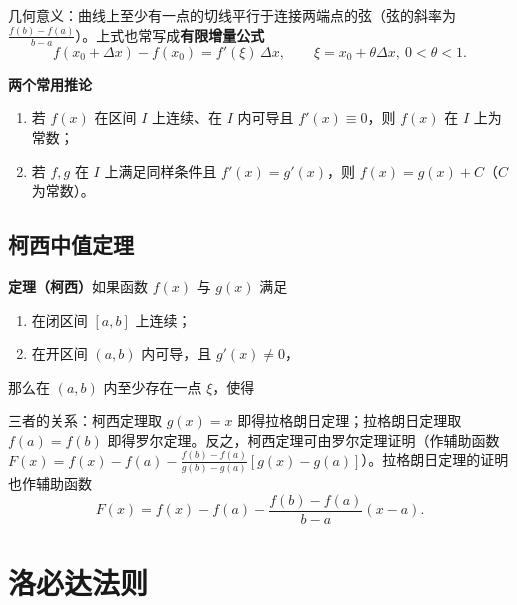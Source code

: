 \noindent 几何意义：曲线上至少有一点的切线平行于连接两端点的弦（弦的斜率为 $\frac{f(b)-f(a)}{b-a}$）。上式也常写成\textbf{有限增量公式}
\[
f(x_0+\Delta x)-f(x_0)=f'(\xi)\,\Delta x,\qquad \xi=x_0+\theta\Delta x,\ 0<\theta<1 .
\]

\textbf{两个常用推论}
\begin{enumerate}
    \item 若 $f(x)$ 在区间 $I$ 上连续、在 $I$ 内可导且 $f'(x)\equiv0$，则 $f(x)$ 在 $I$ 上为常数；
    \item 若 $f,g$ 在 $I$ 上满足同样条件且 $f'(x)=g'(x)$，则 $f(x)=g(x)+C$（$C$ 为常数）。
\end{enumerate}


\subsection{柯西中值定理}
\textbf{定理（柯西）}\quad 如果函数 $f(x)$ 与 $g(x)$ 满足
\begin{enumerate}
    \item 在闭区间 $[a,b]$ 上连续；
    \item 在开区间 $(a,b)$ 内可导，且 $g'(x)\neq0$，
\end{enumerate}
那么在 $(a,b)$ 内至少存在一点 $\xi$，使得

\noindent 三者的关系：柯西定理取 $g(x)=x$ 即得拉格朗日定理；拉格朗日定理取 $f(a)=f(b)$ 即得罗尔定理。反之，柯西定理可由罗尔定理证明（作辅助函数 $F(x)=f(x)-f(a)-\frac{f(b)-f(a)}{g(b)-g(a)}[g(x)-g(a)]$）。拉格朗日定理的证明也作辅助函数
\[
F(x)=f(x)-f(a)-\frac{f(b)-f(a)}{b-a}(x-a).
\]


\section{洛必达法则}

